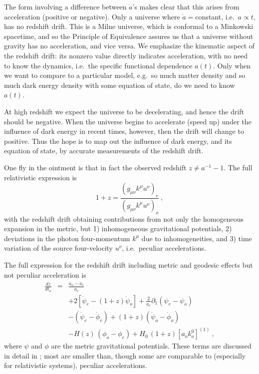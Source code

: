 \documentclass[preprint]{aastex}
\newcommand{\be}{\begin{equation}}
\newcommand{\ee}{\end{equation}}
\newcommand{\bea}{\begin{eqnarray}}
\newcommand{\eea}{\end{eqnarray}}
\begin{document}
The form involving a difference 
between $\dot a$'s makes clear that this arises from acceleration (positive 
or negative).  Only a universe where $\dot a=$constant, i.e.\ $a\propto t$, 
has no redshift drift.  This is a Milne universe, which is conformal to a 
Minkowski spacetime, and so the Principle of Equivalence assures us that 
a universe without gravity has no acceleration, and vice versa. 
We emphasize the kinematic aspect of the redshift drift: its nonzero 
value directly indicates acceleration, with no need to know the dynamics, 
i.e.\ the specific functional dependence $a(t)$. Only when we want to compare 
to a particular model, e.g.\ so much matter density and so much dark energy 
density with some equation of state, do we need to know $a(t)$. 

At high redshift we expect the universe to be decelerating, and hence 
the drift should be negative.  When the universe begins to accelerate 
(speed up) under the influence of dark energy in recent times, however, 
then the drift will change to positive.  Thus the hope is to map out the 
influence of dark energy, and its equation of state, by accurate 
measurements of the redshift drift. 

One fly in the ointment is that in fact the observed redshift 
$z\ne a^{-1}-1$. The full relativistic expression is 
\be 
1+z=\frac{(g_{\mu\nu}k^\mu u^\nu)_e}{(g_{\mu\nu}k^\mu u^\nu)_o}\ , 
\label{eq:zgen} 
\ee 
with the redshift drift obtaining contributions from not only the 
homogeneous expansion in the metric, but 1) inhomogeneous gravitational 
potentials, 2) deviations in the photon four-momentum $k^\mu$ due to 
inhomogeneities, and 3) time variation of the source four-velocity $u^\nu$, 
i.e.\ peculiar accelerations.  

The full expression for the redshift drift including metric and geodesic 
effects but not peculiar acceleration is 
\bea 
\frac{dz}{dt_o}&=&\frac{\dot a_o-\dot a_e}{a_e}\\ 
&&+2[\dot\psi_e-(1+z)\dot\psi_o]
+\frac{2}{a_e}\partial_1(\psi_e-\psi_o)\nonumber\\ 
&&-(\dot\psi_e-\dot\phi_e)+(1+z)(\dot\psi_o-\dot\phi_o)\nonumber\\ 
&&-H(z)\,(\phi_o-\phi_e)+H_0\,(1+z)[a_o k^0_o]^{(1)}\ ,\nonumber  
\eea 
where $\psi$ and $\phi$ are the metric gravitational potentials. 
These terms are discussed in detail in \cite{10044646}; most are smaller 
than, though some are comparable to (especially for relativistic systems), 
peculiar accelerations. 
\end{document}
